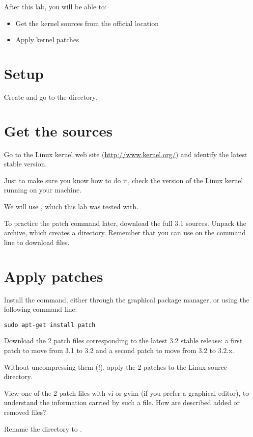 
After this lab, you will be able to:
\begin{itemize}
\item Get the kernel sources from the official location
\item Apply kernel patches
\end{itemize}

\section{Setup}

Create and go to the  directory.

\section{Get the sources}

Go to the Linux kernel web site (\url{http://www.kernel.org/}) and
identify the latest stable version.

Just to make sure you know how to do it, check the version of the
Linux kernel running on your machine.

We will use , which this lab was tested with.

To practice the patch command later, download the full 3.1
sources. Unpack the archive, which creates a 
directory. Remember that you can use  on the command
line to download files.

\section{Apply patches}

Install the  command, either through the graphical package
manager, or using the following command line:

\begin{verbatim}
sudo apt-get install patch
\end{verbatim}

Download the 2 patch files corresponding to the latest 3.2 stable
release: a first patch to move from 3.1 to 3.2 and a second patch to
move from 3.2 to 3.2.x.

Without uncompressing them (!), apply the 2 patches to the Linux
source directory.

View one of the 2 patch files with vi or gvim (if you prefer a
graphical editor), to understand the information carried by such a
file. How are described added or removed files?

Rename the  directory to .
